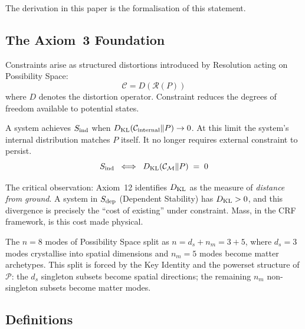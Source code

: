 \documentclass[12pt, a4paper]{article}
\begin{document}
The derivation in this paper is the formalisation of this
statement.

\subsection{The Axiom~3 Foundation}
\label{zc16:sec:axiom3}

\begin{formalbox}[title={Axiom~3: Constraint (CRF v17.5 Part~I)}]
Constraints arise as structured distortions introduced by
Resolution acting on Possibility Space:
\[
  \mathcal{C} = D(\mathcal{R}(P))
\]
where $D$ denotes the distortion operator. Constraint reduces
the degrees of freedom available to potential states.
\end{formalbox}

\begin{formalbox}[title={Axiom~12: Independent Stability
  $S_{\rm ind}$ (CRF v17.5 Part~I)}]
A system achieves $S_{\rm ind}$ when
$D_{\rm KL}(\mathcal{C}_{\rm internal} \| P) \to 0$.
At this limit the system's internal distribution matches $P$
itself. It no longer requires external constraint to persist.
\[
  S_{\rm ind} \;\iff\; D_{\rm KL}(\mathcal{C}_\mathcal{M}
  \| P) \;=\; 0
\]
\end{formalbox}

The critical observation: Axiom~12 identifies $D_{\rm KL}$ as
the measure of \emph{distance from ground}. A system in
$S_{\rm dep}$ (Dependent Stability) has $D_{\rm KL} > 0$,
and this divergence is precisely the ``cost of existing''
under constraint. Mass, in the CRF framework, is this cost
made physical.

\begin{formalbox}[title={Matter Split (CRF v17.5 Part~IX)}]
The $n = 8$ modes of Possibility Space split as
$n = d_s + n_m = 3 + 5$, where $d_s = 3$ modes crystallise
into spatial dimensions and $n_m = 5$ modes become matter
archetypes. This split is forced by the Key Identity and the
powerset structure of $\mathcal{P}$: the $d_s$ singleton
subsets become spatial directions; the remaining $n_m$
non-singleton subsets become matter modes.
\end{formalbox}

\subsection{Definitions}
\label{zc16:sec:defs}
\end{document}
